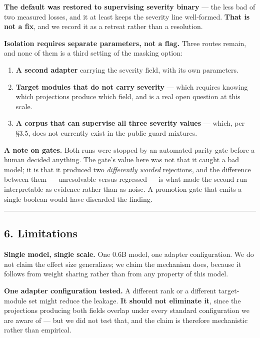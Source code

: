 \textbf{The default was restored to supervising severity binary} --- the less bad of two measured losses,
and it at least keeps the severity line well-formed. \textbf{That is not a fix}, and we record it as a
retreat rather than a resolution.

\textbf{Isolation requires separate parameters, not a flag.} Three routes remain, and none of them is a
third setting of the masking option:

\begin{enumerate}
\def\labelenumi{\arabic{enumi}.}
\tightlist
\item
  \textbf{A second adapter} carrying the severity field, with its own parameters.
\item
  \textbf{Target modules that do not carry severity} --- which requires knowing which projections produce
  which field, and is a real open question at this scale.
\item
  \textbf{A corpus that can supervise all three severity values} --- which, per §3.5, does not currently
  exist in the public guard mixtures.
\end{enumerate}

\textbf{A note on gates.} Both runs were stopped by an automated parity gate before a human decided
anything. The gate's value here was not that it caught a bad model; it is that it produced two
\emph{differently worded} rejections, and the difference between them --- unresolvable versus regressed ---
is what made the second run interpretable as evidence rather than as noise. A promotion gate that
emits a single boolean would have discarded the finding.

\begin{center}\rule{0.5\linewidth}{0.5pt}\end{center}

\subsection{6. Limitations}\label{limitations}

\textbf{Single model, single scale.} One 0.6B model, one adapter configuration. We do not claim the effect
size generalizes; we claim the mechanism does, because it follows from weight sharing rather than
from any property of this model.

\textbf{One adapter configuration tested.} A different rank or a different target-module set might reduce
the leakage. \textbf{It should not eliminate it}, since the projections producing both fields overlap
under every standard configuration we are aware of --- but we did not test that, and the claim is
therefore mechanistic rather than empirical.

